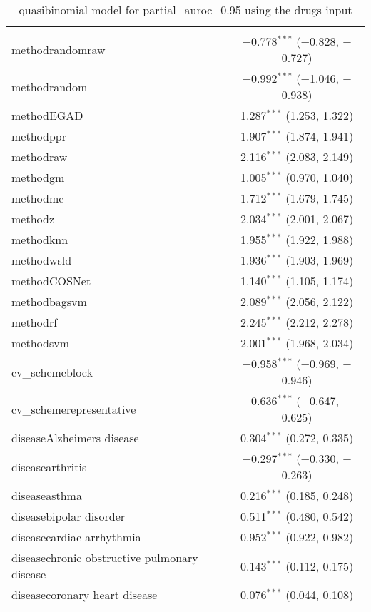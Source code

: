 
\begin{table}[!htbp] \centering 
  \caption{quasibinomial model for partial_auroc_0.95 using the drugs input} 
  \label{} 
\begin{tabular}{@{\extracolsep{5pt}}lc} 
\\[-1.8ex]\hline 
\hline \\[-1.8ex] 
 methodrandomraw & $-$0.778$^{***}$ ($-$0.828, $-$0.727) \\ 
  methodrandom & $-$0.992$^{***}$ ($-$1.046, $-$0.938) \\ 
  methodEGAD & 1.287$^{***}$ (1.253, 1.322) \\ 
  methodppr & 1.907$^{***}$ (1.874, 1.941) \\ 
  methodraw & 2.116$^{***}$ (2.083, 2.149) \\ 
  methodgm & 1.005$^{***}$ (0.970, 1.040) \\ 
  methodmc & 1.712$^{***}$ (1.679, 1.745) \\ 
  methodz & 2.034$^{***}$ (2.001, 2.067) \\ 
  methodknn & 1.955$^{***}$ (1.922, 1.988) \\ 
  methodwsld & 1.936$^{***}$ (1.903, 1.969) \\ 
  methodCOSNet & 1.140$^{***}$ (1.105, 1.174) \\ 
  methodbagsvm & 2.089$^{***}$ (2.056, 2.122) \\ 
  methodrf & 2.245$^{***}$ (2.212, 2.278) \\ 
  methodsvm & 2.001$^{***}$ (1.968, 2.034) \\ 
  cv\_schemeblock & $-$0.958$^{***}$ ($-$0.969, $-$0.946) \\ 
  cv\_schemerepresentative & $-$0.636$^{***}$ ($-$0.647, $-$0.625) \\ 
  diseaseAlzheimers disease & 0.304$^{***}$ (0.272, 0.335) \\ 
  diseasearthritis & $-$0.297$^{***}$ ($-$0.330, $-$0.263) \\ 
  diseaseasthma & 0.216$^{***}$ (0.185, 0.248) \\ 
  diseasebipolar disorder & 0.511$^{***}$ (0.480, 0.542) \\ 
  diseasecardiac arrhythmia & 0.952$^{***}$ (0.922, 0.982) \\ 
  diseasechronic obstructive pulmonary disease & 0.143$^{***}$ (0.112, 0.175) \\ 
  diseasecoronary heart disease & 0.076$^{***}$ (0.044, 0.108) \\ 

\end{tabular}
\end{table}
